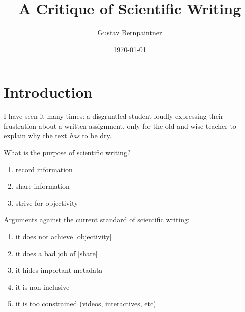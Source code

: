 \documentclass{article}
\title{A Critique of Scientific Writing}
\author{Gustav Bernpaintner}
\date{\today}
\begin{document}
\maketitle

\section{Introduction}

I have seen it many times: a disgruntled student loudly expressing their frustration about a written assignment, only for the old and wise teacher to explain why the text \textit{has} to be dry.

What is the purpose of scientific writing?

\begin{enumerate}
    \item record information
    \item share information
    \label{share}
    \item strive for objectivity
    \label{objectivity}
\end{enumerate}

Arguments against the current standard of scientific writing:
\begin{enumerate}[label=\alph*.]
    \item it does not achieve \ref{objectivity}
    \item it does a bad job of \ref{share}
    \item it hides important metadata
    \item it is non-inclusive
    \item it is too constrained (videos, interactives, etc)
\end{enumerate}

\section{}
\end{document}
